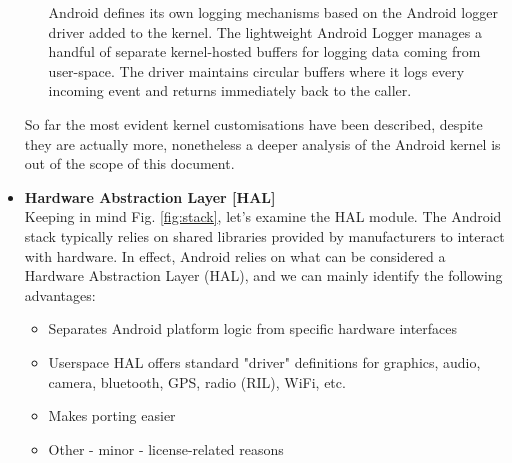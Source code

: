 \begin{itemize}
\begin{itemize}
	Android defines its own logging mechanisms based on the Android logger driver added to the kernel. The lightweight Android Logger manages a handful of separate kernel-hosted buffers for logging data coming from user-space. The driver maintains circular buffers where it logs every incoming event and returns immediately back to the caller.
	\end{itemize}
So far the most evident kernel customisations have been described, despite they are actually more, nonetheless a deeper analysis of the Android kernel is out of the scope of this document.
\item \textbf{Hardware Abstraction Layer [HAL]}\\
Keeping in mind Fig. \ref{fig:stack}, let's examine the HAL module. The Android stack typically relies on shared libraries provided by manufacturers to interact with hardware. In effect, Android relies on what can be considered a Hardware Abstraction Layer (HAL), and we can mainly identify the following advantages:
	\begin{itemize}
		\item Separates Android platform logic from specific hardware interfaces
		\item User­space HAL offers standard "driver" definitions for graphics, audio, camera, bluetooth, GPS, radio (RIL), WiFi, etc.
		\item Makes porting easier
		\item Other - minor - license-related reasons
	\end{itemize}
\begin{figure}[!htb]
	\centering

\end{figure}
\end{itemize}
